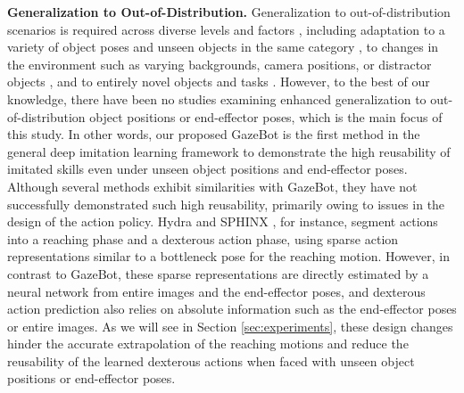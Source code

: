 \textbf{Generalization to Out-of-Distribution.} 
Generalization to out-of-distribution scenarios is required across diverse levels and factors \cite{Bharadhwaj2023}, including adaptation to a variety of object poses and unseen objects in the same category \cite{Simeonov2021, Wang2024, Gao2024}, to changes in the environment such as varying backgrounds, camera positions, or distractor objects \cite{Zhu2023, Yu2023, Xie2024}, and to entirely novel objects and tasks \cite{Shen2023, Stone2023}. 
However, to the best of our knowledge, there have been no studies examining enhanced generalization to out-of-distribution object positions or end-effector poses, which is the main focus of this study.
In other words, our proposed GazeBot is the first method in the general deep imitation learning framework to demonstrate the high reusability of imitated skills even under unseen object positions and end-effector poses.
Although several methods exhibit similarities with GazeBot, they have not successfully demonstrated such high reusability, primarily owing to issues in the design of the action policy. 
Hydra \cite{Belkhale2023} and SPHINX \cite{Sundaresan2024}, for instance, segment actions into a reaching phase and a dexterous action phase, using sparse action representations similar to a bottleneck pose for the reaching motion. 
However, in contrast to GazeBot, these sparse representations are directly estimated by a neural network from entire images and the end-effector poses, and dexterous action prediction also relies on absolute information such as the end-effector poses or entire images. As we will see in Section \ref{sec:experiments}, these design changes hinder the accurate extrapolation of the reaching motions and reduce the reusability of the learned dexterous actions when faced with unseen object positions or end-effector poses.